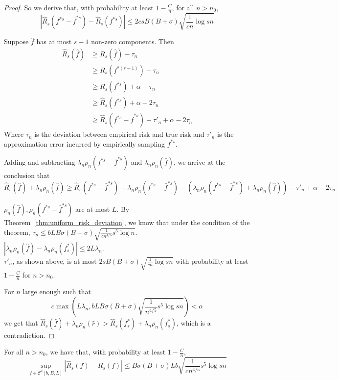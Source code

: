 \documentclass{article}
\begin{document}
\begin{proof}
So we derive that, with probability at least $1 -\frac{C}{n}$, for all $n > n_0$,
\[
|\hat{R}_s(f^{*s} - \bar{f}^{*s}) - \hat{R}_s(f^{*s})|\leq 2csB(B+\sigma) \sqrt{\frac{1}{cn} \log sn}
\]

Suppose $\hat{f}$ has at most $s-1$ non-zero components. Then
\begin{align*}
\hat{R}_s( \hat{f}) &\geq R_s(\hat{f}) - \tau_n \\
	&\geq R_s(f^{*(s-1)}) - \tau_n \\
	&\geq R_s(f^{*s}) + \alpha - \tau_n \\
	&\geq \hat{R}_s(f^{*s}) + \alpha - 2 \tau_n \\
	&\geq \hat{R}_s(f^{*s} - \bar{f}^{*s}) -\tau'_n + \alpha - 2\tau_n 
\end{align*}
Where $\tau_n$ is the deviation between empirical risk and true risk and $\tau'_n$ is the approximation error incurred by empirically sampling $f^{*s}$.

Adding and subtracting $ \lambda_n \rho_n(f^{*s} - \bar{f}^{*s})$ and $ \lambda_n \rho_n(\hat{f})$, we arrive at the conclusion that
\[
\hat{R}_s(\hat{f}) + \lambda_n \rho_n(\hat{f}) \geq \hat{R}_s(f^{*s} - \bar{f}^{*s}) + \lambda_n \rho_n(f^{*s} - \bar{f}^{*s}) - ( \lambda_n \rho_n(f^{*s} - \bar{f}^{*s}) + \lambda_n \rho_n(\hat{f}) ) -\tau'_n + \alpha - 2 \tau_n
\]

$\rho_n(\hat{f}), \rho_n(f^{*s} - \bar{f}^{*s})$ are at most $L$. By Theorem~\ref{thm:uniform_risk_deviation}, we know that under the condition of the theorem, $\tau_n \leq  bLB\sigma(B+\sigma)\sqrt{ \frac{1}{cn^{4/5}} s^5 \log n}$.\\

$|\lambda_n \rho_n(\hat{f}) - \lambda_n \rho_n(f^*_s)| \leq 2L \lambda_n$.\\

$\tau'_n$, as shown above, is at most $2sB(B+\sigma) \sqrt{\frac{1}{cn} \log sn}$ with probability at least $1-\frac{C}{n}$ for $n > n_0$.

For $n$ large enough such that
\[
c\max(L\lambda_n,  bLB\sigma(B+\sigma) \sqrt{ \frac{1}{n^{4/5}} s^5 \log sn}) < \alpha
\]
we get that $\hat{R}_s(\hat{f}) + \lambda_n \rho_n(\hat{r}) > \hat{R}_s(f^*_s) + \lambda_n \rho_n(f^*_s)$, which is a contradiction.

\end{proof}

%

\begin{theorem}
\label{thm:uniform_risk_deviation}
For all $n > n_0$, we have that, with probability at least $1 - \frac{C}{n}$, 
\[
\sup_{f \in \mathcal{C}^s[b,B,L]} |\hat{R}_s(f) - R_s(f)| \leq B\sigma(B+\sigma)Lb\sqrt{ \frac{1}{cn^{4/5}} s^5 \log sn}
\]
\end{theorem}
\end{document}

